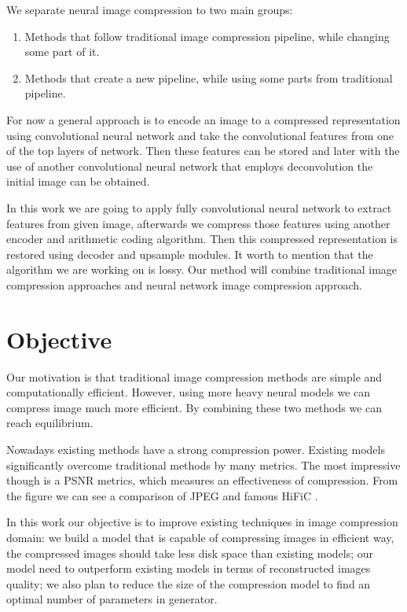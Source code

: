 We separate neural image compression to two main groups:

\begin{enumerate}
    \item Methods that follow traditional image compression pipeline, while changing some part of it.
    \item Methods that create a new pipeline, while using some parts from traditional pipeline.
\end{enumerate}

For now a general approach is to encode an image to a compressed representation using convolutional neural network and take the convolutional features from one of the top layers of network. Then these features can be stored and later with the use of another convolutional neural network that employs deconvolution the initial image can be obtained.

In this work we are going to apply fully convolutional neural network to extract features from given image, afterwards we compress those features using another encoder and arithmetic coding algorithm. Then this compressed representation is restored using decoder and upsample modules. It worth to mention that the algorithm we are working on is lossy. Our method will combine traditional image compression approaches and neural network image compression approach.

\section{Objective}

Our motivation is that traditional image compression methods are simple and computationally efficient. However, using more heavy neural models we can compress image much more efficient. By combining these two methods we can reach equilibrium.

Nowadays existing methods have a strong compression power. Existing models significantly overcome traditional methods by many metrics. The most impressive though is a PSNR metrics, which measures an effectiveness of compression. From the figure we can see a comparison of JPEG and famous HiFiC \cite{mentzer_high_fidelity_2020}.

In this work our objective is to improve existing techniques in image compression domain: we build a model that is capable of compressing images in efficient way, the compressed images should take less disk space than existing models; our model need to outperform existing models in terms of reconstructed images quality; we also plan to reduce the size of the compression model to find an optimal number of parameters in generator.

